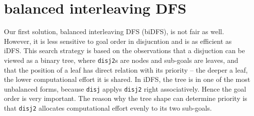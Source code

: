 \documentclass[format=acmlarge, review=true, authordraft=true]{acmart}
\begin{document}
% 
% 
% 
% 
% 
%   
 
\section{balanced interleaving DFS}

Our first solution, balanced interleaving DFS (biDFS), is not fair as well. 
However, it is less sensitive to goal order in disjucntion and is as efficient 
as iDFS. This search strategy is based on the  observations that a disjuction 
can be viewed as a binary tree, where \texttt{disj2}s are nodes 
and sub-goals are leaves, and that the position of a leaf has direct relation 
with its priority -- the deeper a leaf, the lower computational effort it is 
shared. In iDFS, the tree is in one of the most unbalanced forms, because 
\texttt{disj} applys \texttt{disj2} right associatively. Hence the goal order 
is very important. The reason why the tree shape can determine priority is that 
\texttt{disj2} allocates computational effort evenly to its two sub-goals.
\end{document}
